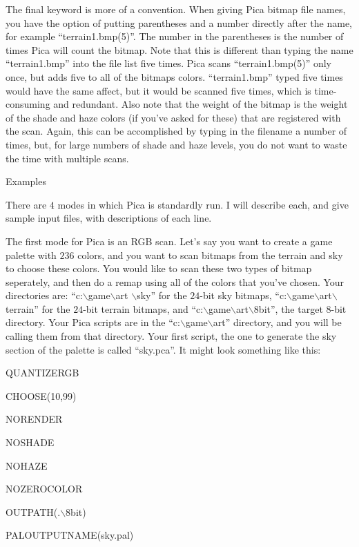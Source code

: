 \newpar
The final keyword is more of a convention. When giving Pica bitmap file names, you have the
option of putting parentheses and a number directly after the name, for example
``terrain1.bmp(5)''. The number in the parentheses is the number of times Pica will count the
bitmap. Note that this is different than typing the name ``terrain1.bmp'' into the file list 
five times. Pica scans ``terrain1.bmp(5)'' only once, but adds five to all of the bitmaps colors.
``terrain1.bmp'' typed five times would have the same affect, but it would be scanned five times,
which is time-consuming and redundant. Also note that the weight of the bitmap is the weight
of the shade and haze colors (if you've asked for these) that are registered with the scan. 
Again, this can be accomplished by typing in the filename a number of times, but, for large
numbers of shade and haze levels, you do not want to waste the time with multiple scans.

\newpar
{\SectionFont Examples}

\newpar There are $4$ modes in which Pica is standardly run. I will describe each, and give
sample input files, with descriptions of each line.


\newpar
The first mode for Pica is an RGB scan. Let's say you want to create a game palette with
$236$ colors, and you want to scan bitmaps from the terrain and sky to choose these colors.
You would like to scan these two types of bitmap seperately, and then do a remap using
all of the colors that you've chosen. Your directories are: ``c:$\backslash$game$\backslash$art
$\backslash$sky'' for the $24$-bit
sky bitmaps, ``c:$\backslash$game$\backslash$art$\backslash$terrain'' for the $24$-bit terrain 
bitmaps, and ``c:$\backslash$game$\backslash$art$\backslash$8bit'',
the target 8-bit directory. Your Pica scripts are in the ``c:$\backslash$game$\backslash$art'' directory, and you will
be calling them from that directory. Your first script, the one to generate the sky section
of the palette is called ``sky.pca''. It might look something like this:

QUANTIZERGB


CHOOSE(10,99)


NORENDER 


NOSHADE


NOHAZE


NOZEROCOLOR


OUTPATH(.$\backslash$8bit)


PALOUTPUTNAME(sky.pal)


